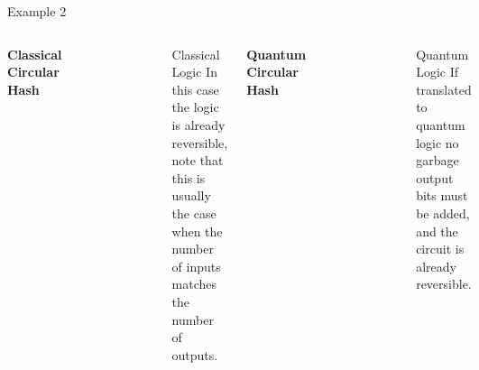 \documentclass[pdf]{beamer}
\begin{document}
\begin{frame}{Example 2}
\begin{columns}
\vspace{-1 em}
\begin{center}
\textbf{Classical Circular Hash}
\end{center}
\vspace{-1 em}
\begin{figure}[ht]
\begin{center}
\includegraphics[scale=0.275]{figures/fbch.png}
\end{center}
\end{figure}
\begin{block}{Classical Logic}
In this case the logic is already reversible, note that this is usually the case when the number of inputs matches the number of outputs.
\end{block}
\vspace{-1 em}
\begin{center}
\textbf{Quantum Circular Hash}
\end{center}
\begin{figure}[ht]
\begin{center}
\vspace{2 em}
  \includegraphics[scale=0.4]{figures/4-bit_circular_hash_qc.png}
\end{center}
\end{figure}
\begin{block}{Quantum Logic}
If translated to quantum logic no garbage output bits must be added, and the circuit is already reversible. 
\end{block}
\end{columns}

\end{frame}
\end{document}
